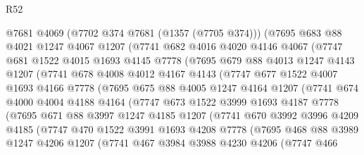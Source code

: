 \begin{lexlean}{R52}
\begin{coremodule}
      @7681
      @4069
      (@7702 @374 @7681 (@1357 (@7705 @374)))
      (@7695
        @683
        @88
        @4021
        @1247
        @4067
        @1207
        (@7741
          @682
          @4016
          @4020
          @4146
          @4067
          (@7747
            @681
            @1522
            @4015
            @1693
            @4145
            @7778
            (@7695
              @679
              @88
              @4013
              @1247
              @4143
              @1207
              (@7741
                @678
                @4008
                @4012
                @4167
                @4143
                (@7747
                  @677
                  @1522
                  @4007
                  @1693
                  @4166
                  @7778
                  (@7695
                    @675
                    @88
                    @4005
                    @1247
                    @4164
                    @1207
                    (@7741
                      @674
                      @4000
                      @4004
                      @4188
                      @4164
                      (@7747
                        @673
                        @1522
                        @3999
                        @1693
                        @4187
                        @7778
                        (@7695
                          @671
                          @88
                          @3997
                          @1247
                          @4185
                          @1207
                          (@7741
                            @670
                            @3992
                            @3996
                            @4209
                            @4185
                            (@7747
                              @470
                              @1522
                              @3991
                              @1693
                              @4208
                              @7778
                              (@7695
                                @468
                                @88
                                @3989
                                @1247
                                @4206
                                @1207
                                (@7741
                                  @467
                                  @3984
                                  @3988
                                  @4230
                                  @4206
                                  (@7747
                                    @466

\end{coremodule}
\end{lexlean}
